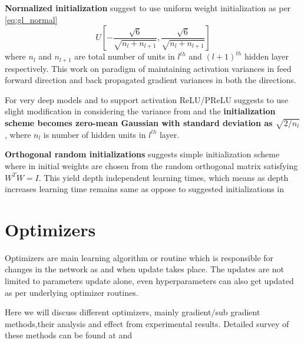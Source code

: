 \noindent \textbf{Normalized initialization} \cite{Glorot10understandingthe} suggest to use uniform weight initialization as per \ref{eq:gl_normal}
\begin{equation}\label{eq:gl_normal}
U[-\frac{{\sqrt{6}}}{{\sqrt{n_l+n_{l+1}}}}, \frac{{\sqrt{6}}}{{\sqrt{n_l+n_{l+1}}}}]
\end{equation}
where $n_l$ and $n_{l+1}$ are total number of units in $l^{th}$ and ${(l+1)}^{th}$ hidden layer respectively. This work on paradigm of maintaining activation variances in feed forward direction and back propagated gradient variances in both the directions.

\noindent For very deep models and to support activation ReLU/PReLU \cite{DBLP:journals/corr/HeZR015} suggests to use slight modification in considering the variance from \cite{Glorot10understandingthe} and the \textbf{initialization scheme becomes zero-mean Gaussian with standard deviation as $\sqrt{2/n_l}$}, where $n_l$ is number of hidden units in $l^{th}$ layer.

\noindent \textbf{Orthogonal random initializations} \cite{DBLP:journals/corr/SaxeMG13} suggests simple initialization scheme where in initial weights are chosen from the random orthogonal matrix satisfying $W^TW=I$. This yield depth independent learning times, which means as depth increases learning time remains same as oppose to suggested initializations in \cite{LeCun:1998:EB:645754.668382} \cite{Glorot10understandingthe} 




\section{Optimizers}

\noindent Optimizers are main learning algorithm or routine which is responsible for changes in the network as and when update takes place. The updates are not limited to parameters update alone, even hyperparameters can also get updated as per underlying optimizer routines. 

\noindent Here we will discuss different optimizers, mainly gradient/sub gradient methods,their analysis and effect from experimental results. Detailed survey of these methods can be found at \cite{DBLP:journals/corr/Ruder16} and \cite{nadam_}


